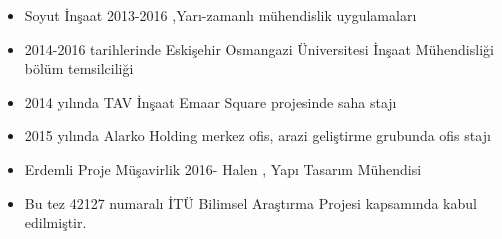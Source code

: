 \begin{itemize}
\item Soyut İnşaat 2013-2016 ,Yarı-zamanlı mühendislik uygulamaları
\item 2014-2016 tarihlerinde Eskişehir Osmangazi Üniversitesi İnşaat Mühendisliği
bölüm temsilciliği
\item 2014 yılında TAV İnşaat Emaar Square projesinde saha stajı
\item 2015 yılında Alarko Holding merkez ofis, arazi geliştirme grubunda
ofis stajı
\item Erdemli Proje Müşavirlik 2016- Halen , Yapı Tasarım Mühendisi
\item Bu tez 42127 numaralı İTÜ Bilimsel Araştırma Projesi kapsamında kabul
edilmiştir.
\end{itemize}
